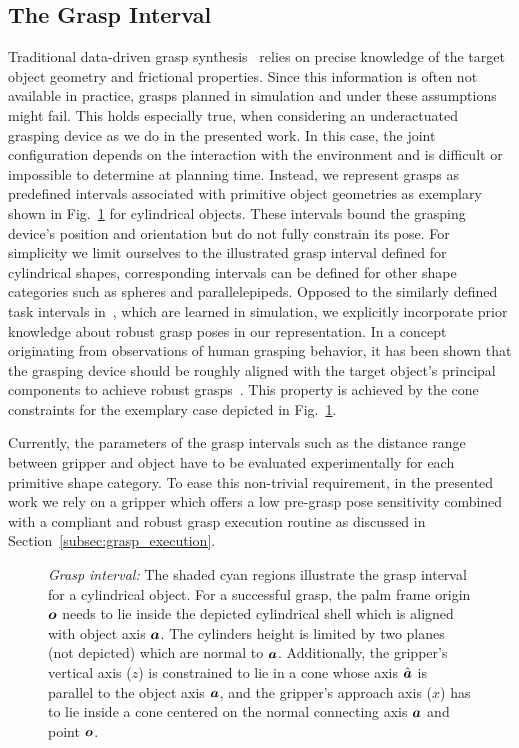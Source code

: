 \subsection{The Grasp Interval}
\label{subsec:grasp_interval}
%
Traditional data-driven grasp synthesis~\cite{Bohg14} relies on precise knowledge of the target
object geometry and frictional properties. Since this information is often not available in
practice, grasps planned in simulation and under these assumptions might fail. This holds especially
true, when considering an underactuated grasping device as we do in the presented work. In this
case, the joint configuration depends on the interaction with the environment and is difficult or
impossible to determine at planning time. Instead, we represent grasps as predefined intervals
associated with primitive object geometries as exemplary shown in Fig.~\ref{fig:grasp_interval} for
cylindrical objects. These intervals bound the grasping device's position and orientation but do not
fully constrain its pose. For simplicity we limit ourselves to the illustrated grasp interval
defined for cylindrical shapes, corresponding intervals can be defined for other shape categories
such as spheres and parallelepipeds. Opposed to the similarly defined task intervals
in~\cite{Gien08a, Gien08b}, which are learned in simulation, we explicitly incorporate prior
knowledge about robust grasp poses in our representation. In a concept originating from observations
of human grasping behavior, it has been shown that the grasping device should be roughly aligned
with the target object's principal components to achieve robust grasps~\cite{Bala12}. This property
is achieved by the cone constraints for the exemplary case depicted in
Fig.~\ref{fig:grasp_interval}.

Currently, the parameters of the grasp intervals such as the distance range between gripper and
object have to be evaluated experimentally for each primitive shape category. To ease this
non-trivial requirement, in the presented work we rely on a gripper which offers a low pre-grasp
pose sensitivity combined with a compliant and robust grasp execution routine as discussed in
Section~\ref{subsec:grasp_execution}.
%
\begin{figure}[t!] 
   \centering
     
    \caption{\textit{Grasp interval:} The shaded cyan regions illustrate the grasp interval for a
      cylindrical object. For a successful grasp, the palm frame origin $\mbox{\boldmath $o$}$ needs to lie
      inside the depicted cylindrical shell which is aligned with object axis $\mbox{\boldmath $a$}$. The
      cylinders height is limited by two planes (not depicted) which are normal to
      $\mbox{\boldmath $a$}$. Additionally, the gripper's vertical axis ($z$) is constrained to lie in a cone
      whose axis $\hat{\mbox{\boldmath $a$}}$ is parallel to the object axis $\mbox{\boldmath $a$}$, and the gripper's
      approach axis ($x$) has to lie inside a cone centered on the normal connecting axis $\mbox{\boldmath $a$}$
      and point $\mbox{\boldmath $o$}$.}
   \label{fig:grasp_interval}
   \vspace{-0.5cm}
\end{figure}
%
